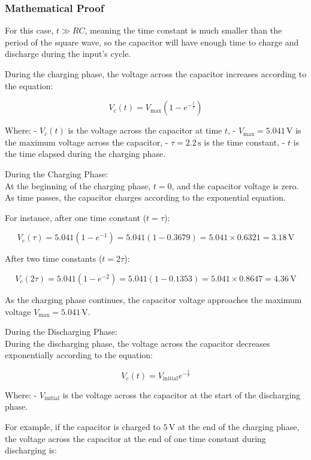 \documentclass[journal]{IEEEtran}
\begin{document}
\subsubsection{Mathematical Proof}

For this case, \( t \gg RC \), meaning the time constant is much smaller than the period of the square wave, so the capacitor will have enough time to charge and discharge during the input's cycle.

During the charging phase, the voltage across the capacitor increases according to the equation:

\[
V_c(t) = V_{\text{max}} \left( 1 - e^{-\frac{t}{\tau}} \right)
\]

Where:
- \( V_c(t) \) is the voltage across the capacitor at time \( t \),
- \( V_{\text{max}} = 5.041 \, \text{V} \) is the maximum voltage across the capacitor,
- \( \tau = 2.2 \, \text{s} \) is the time constant,
- \( t \) is the time elapsed during the charging phase.

During the Charging Phase: \\ 

At the beginning of the charging phase, \( t = 0 \), and the capacitor voltage is zero. As time passes, the capacitor charges according to the exponential equation.

For instance, after one time constant (\( t = \tau \)):

\[
V_c(\tau) = 5.041 \left( 1 - e^{-1} \right) = 5.041 \left( 1 - 0.3679 \right) = 5.041 \times 0.6321 = 3.18 \, \text{V}
\]

After two time constants (\( t = 2\tau \)):

\[
V_c(2\tau) = 5.041 \left( 1 - e^{-2} \right) = 5.041 \left( 1 - 0.1353 \right) = 5.041 \times 0.8647 = 4.36 \, \text{V}
\]

As the charging phase continues, the capacitor voltage approaches the maximum voltage \( V_{\text{max}} = 5.041 \, \text{V} \).

During the Discharging Phase: \\ 

During the discharging phase, the voltage across the capacitor decreases exponentially according to the equation:

\[
V_c(t) = V_{\text{initial}} e^{-\frac{t}{\tau}}
\]

Where:
- \( V_{\text{initial}} \) is the voltage across the capacitor at the start of the discharging phase.

For example, if the capacitor is charged to \( 5 \, \text{V} \) at the end of the charging phase, the voltage across the capacitor at the end of one time constant during discharging is:
\end{document}
